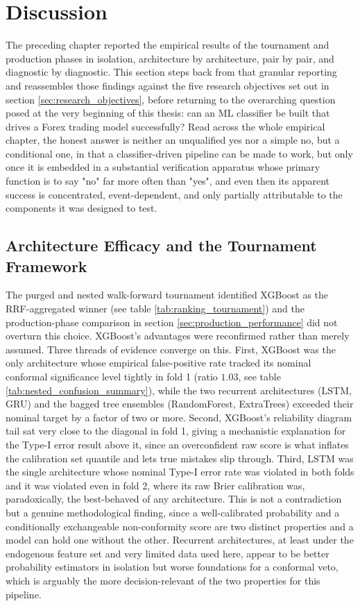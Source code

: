 \documentclass[12pt, a4paper]{article}
\begin{document}
\section{Discussion}

The preceding chapter reported the empirical results of the tournament and production phases in isolation, architecture by architecture, pair by pair, and diagnostic by diagnostic. 
This section steps back from that granular reporting and reassembles those findings against the five research objectives set out in section \ref{sec:research_objectives}, before 
returning to the overarching question posed at the very beginning of this thesis: can an ML classifier be built that drives a Forex trading model successfully? Read across the whole 
empirical chapter, the honest answer is neither an unqualified yes nor a simple no, but a conditional one, in that a classifier-driven pipeline can be made to work, but only once 
it is embedded in a substantial verification apparatus whose primary function is to say "no" far more often than "yes", and even then its apparent success is concentrated, 
event-dependent, and only partially attributable to the components it was designed to test.


\subsection{Architecture Efficacy and the Tournament Framework}

The purged and nested walk-forward tournament identified XGBoost as the RRF-aggregated winner (see table \ref{tab:ranking_tournament}) and the production-phase comparison 
in section \ref{sec:production_performance} did not overturn this choice. XGBoost's advantages were reconfirmed rather than merely assumed. Three 
threads of evidence converge on this. First, XGBoost was the only architecture whose empirical false-positive rate tracked its nominal conformal significance level tightly in fold 1 
(ratio $1.03$, see table \ref{tab:nested_confusion_summary}), while the two recurrent architectures (LSTM, GRU) and the bagged tree ensembles (RandomForest, ExtraTrees) exceeded their 
nominal target by a factor of two or more. Second, XGBoost's reliability diagram tail sat very close to the diagonal in fold 1, giving a mechanistic explanation for the Type-I error result 
above it, since an overconfident raw score is what inflates the calibration set quantile and lets true mistakes slip through. Third, LSTM was the single architecture whose 
nominal Type-I error rate was violated in both folds and it was violated even in fold 2, where its raw Brier calibration was, paradoxically, the best-behaved of any architecture. This is not a 
contradiction but a genuine methodological finding, since a well-calibrated probability and a conditionally exchangeable non-conformity score are two distinct properties and a model can hold 
one without the other. Recurrent architectures, at least under the endogenous feature set and very limited data used here, appear to be better probability estimators in isolation but 
worse foundations for a conformal veto, which is arguably the more decision-relevant of the two properties for this pipeline.
\end{document}
